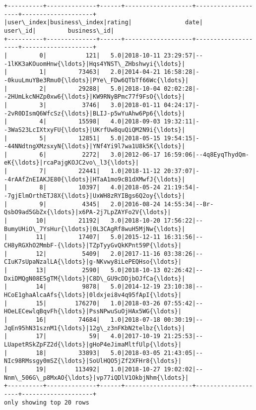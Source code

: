 \documentclass[11pt]{article}
\begin{document}
    \begin{Verbatim}[commandchars=\\\{\}]
+----------+--------------+------+-------------------+--------------------+--------------------+
|user\_index|business\_index|rating|               date|             user\_id|         business\_id|
+----------+--------------+------+-------------------+--------------------+--------------------+
|         0|           121|   5.0|2018-10-11 23:29:57|---1lKK3aKOuomHnw{\ldots}|Hqs4YNST\_ZHbshwyi{\ldots}|
|         1|         73463|   2.0|2014-04-21 16:58:28|--0kuuLmuYBe3Rmu0{\ldots}|PYe\_FDw6QTbTf66Wc{\ldots}|
|         2|         29288|   5.0|2018-10-04 02:02:28|--2HUmLkcNHZp0xw6{\ldots}|KW9RNyBPmc77f9FsO{\ldots}|
|         3|          3746|   3.0|2018-01-11 04:24:17|--2vR0DIsmQ6WfcSz{\ldots}|BLIJ-p5wYuAhw6Pp6{\ldots}|
|         4|         15598|   4.0|2018-09-03 19:32:11|--3WaS23LcIXtxyFU{\ldots}|UKrfUw8quQiQM2N9i{\ldots}|
|         5|         12851|   5.0|2018-05-15 19:54:15|--44NNdtngXMzsxyN{\ldots}|YNf4Yi9l7wa1U8k5K{\ldots}|
|         6|          2272|   3.0|2012-06-17 16:59:06|--4q8EyqThydQm-eK{\ldots}|rcaPajgKOJC2vo\_l3{\ldots}|
|         7|         22441|   1.0|2018-11-12 20:37:07|--4rAAfZnEIAKJE80{\ldots}|HTaA1mo9cB1dXMwfJ{\ldots}|
|         8|         10397|   4.0|2018-05-24 21:19:54|--7gjElmOrthETJ8X{\ldots}|UxWH8zRYIBgs6Q2oy{\ldots}|
|         9|          4345|   2.0|2016-08-24 14:55:34|--Br-QsbO9ad5GbZx{\ldots}|x6PA-2j7LpZAYFo2V{\ldots}|
|        10|         21192|   3.0|2018-10-20 17:56:22|--BumyUHiO\_7YsHur{\ldots}|0L3CAgRf8wuH5MjNw{\ldots}|
|        11|         17407|   5.0|2015-12-11 16:31:56|--CH8yRGXhO2MmbF-{\ldots}|TZpTyyGvQkKPnt59P{\ldots}|
|        12|          5409|   2.0|2017-11-16 03:38:26|--CIuK7sUpaNzalLA{\ldots}|g-NKvwy8iLePEQHso{\ldots}|
|        13|          2590|   5.0|2018-10-13 02:26:42|--DxiDMQgN08E5gTM{\ldots}|C8D\_GU9cDDjbOJfCa{\ldots}|
|        14|          9878|   5.0|2014-12-19 23:10:38|--HCoE1ghaAlcaAfs{\ldots}|0ldxjei8v4q95fApI{\ldots}|
|        15|        176270|   1.0|2018-03-26 07:55:42|--HOeLECewlqBqvFh{\ldots}|PssNPwuSuOjHAx5WG{\ldots}|
|        16|         74684|   1.0|2018-07-18 00:30:19|--JqEn95hN31sznM1{\ldots}|12g\_z3nFKbN2telbz{\ldots}|
|        17|            59|   4.0|2017-10-19 21:25:53|--LUapetRSkZpFZ2d{\ldots}|gHoP4eJimaMltfUlp{\ldots}|
|        18|         33893|   5.0|2018-03-05 21:43:05|--NIc98RMssgy0mSZ{\ldots}|SoUlHQO5jZf2XFHr8{\ldots}|
|        19|        113492|   1.0|2018-10-27 19:02:02|--Nnm\_506G\_p8MxAO{\ldots}|vp77iQDlV1OkbjNhm{\ldots}|
+----------+--------------+------+-------------------+--------------------+--------------------+
only showing top 20 rows


    \end{Verbatim}
\end{document}
